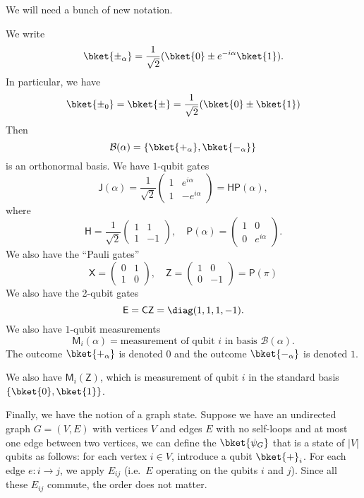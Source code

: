 \documentclass[a4paper]{article}
\newcommand{\qCZ}{\mathsf{CZ}}
\newcommand{\qE}{\mathsf{E}}
\newcommand{\qJ}{\mathsf{J}}
\newcommand{\qM}{\mathsf{M}}
\newcommand{\qH}{\mathsf{H}}
\newcommand{\qP}{\mathsf{P}}
\newcommand{\qX}{\mathsf{X}}
\newcommand{\qZ}{\mathsf{Z}}
\begin{document}
We will need a bunch of new notation.
\begin{notation}
  We write
  \[
    \bket{\pm_\alpha} = \frac{1}{\sqrt{2}} (\bket{0} \pm e^{-i\alpha} \bket{1}).
  \]
  In particular, we have
  \[
    \bket{\pm_0} = \bket{\pm} = \frac{1}{\sqrt{2}}(\bket{0} \pm \bket{1})
  \]
  Then
  \[
    \mathcal{B}(\alpha) = \{\bket{+_\alpha}, \bket{-_\alpha}\}
  \]
  is an orthonormal basis. We have $1$-qubit gates
  \[
    \qJ(\alpha) = \frac{1}{\sqrt{2}}
    \begin{pmatrix}
      1 & e^{i\alpha}\\
      1 & -e^{i\alpha}
    \end{pmatrix} = \qH \qP(\alpha),
  \]
  where
  \[
    \qH = \frac{1}{\sqrt{2}}
    \begin{pmatrix}
      1 & 1\\
      1 & -1
    \end{pmatrix},\quad \qP(\alpha) =
    \begin{pmatrix}
      1 & 0\\
      0 & e^{i\alpha}
    \end{pmatrix}.
  \]
  We also have the ``Pauli gates''
  \[
    \qX=
    \begin{pmatrix}
      0 & 1\\
      1 & 0
    \end{pmatrix},\quad
    \qZ =
    \begin{pmatrix}
      1 & 0\\
      0 & -1
    \end{pmatrix} = \qP(\pi)
  \]
  We also have the 2-qubit gates
  \[
    \qE = \qCZ = \diag(1, 1, 1, -1).
  \]
  We also have $1$-qubit measurements
  \[
    \qM_i(\alpha) = \text{measurement of qubit $i$ in basis $\mathcal{B}(\alpha)$}.
  \]
  The outcome $\bket{+_\alpha}$ is denoted $0$ and the outcome $\bket{-_\alpha}$ is denoted $1$.

  We also have $\qM_i(\qZ)$, which is measurement of qubit $i$ in the standard basis $\{\bket{0}, \bket{1}\}$.

  Finally, we have the notion of a graph state. Suppose we have an undirected graph $G = (V, E)$ with vertices $V$ and edges $E$ with no self-loops and at most one edge between two vertices, we can define the  $\bket{\psi_G}$ that is a state of $|V|$ qubits as follows: for each vertex $i \in V$, introduce a qubit $\bket{+}_i$. For each edge $e: i \to j$, we apply $E_{ij}$ (i.e.\ $E$ operating on the qubits $i$ and $j$). Since all these $E_{ij}$ commute, the order does not matter.


\end{notation}
\end{document}

